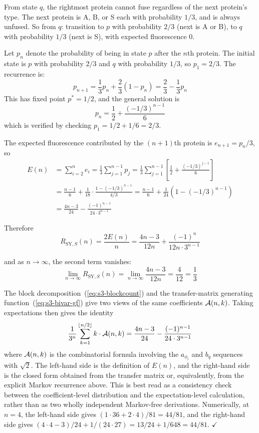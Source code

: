 \documentclass[referee,lineno,pdflatex,sn-mathphys-ay]{sn-jnl}
\DeclarePairedDelimiter\floor{\lfloor}{\rfloor}
\newcommand{\cA}{ {\cal A} }
\begin{document}
From state $q$, the rightmost protein cannot fuse regardless of the next protein's type. The next protein is A, B, or S each with probability $1/3$, and is always unfused. So from $q$: transition to $p$ with probability $2/3$ (next is A or B), to $q$ with probability $1/3$ (next is S), with expected fluorescence $0$.

Let $p_n$ denote the probability of being in state $p$ after the $n$th protein. The initial state is $p$ with probability $2/3$ and $q$ with probability $1/3$, so $p_1 = 2/3$. The recurrence is:
\[
p_{n+1} = \frac{1}{3} p_n + \frac{2}{3}(1 - p_n) = \frac{2}{3} - \frac{1}{3} p_n
\]
This has fixed point $p^* = 1/2$, and the general solution is
\[
p_n = \frac{1}{2} + \frac{(-1/3)^{n-1}}{6}
\]
which is verified by checking $p_1 = 1/2 + 1/6 = 2/3$.

The expected fluorescence contributed by the $(n+1)$th protein is $e_{n+1} = p_n / 3$, so
\begin{align*}
E(n) &= \sum_{i=2}^{n} e_i = \frac{1}{3} \sum_{j=1}^{n-1} p_j = \frac{1}{3} \sum_{j=1}^{n-1} \left[ \frac{1}{2} + \frac{(-1/3)^{j-1}}{6} \right] \\
&= \frac{n-1}{6} + \frac{1}{18} \cdot \frac{1 - (-1/3)^{n-1}}{4/3} = \frac{n-1}{6} + \frac{1}{24}\left(1 - (-1/3)^{n-1}\right) \\
&= \frac{4n - 3}{24} - \frac{(-1)^{n-1}}{24 \cdot 3^{n-1}}
\end{align*}

Therefore
\[
R_{\text{SY},S}(n) = \frac{2E(n)}{n} = \frac{4n-3}{12n} + \frac{(-1)^n}{12n \cdot 3^{n-1}}
\]

and as $n \to \infty$, the second term vanishes:
\[
\lim_{n \to \infty} R_{\text{SY},S}(n) = \lim_{n \to \infty} \frac{4n - 3}{12n} = \frac{4}{12} = \frac{1}{3}
\]

The block decomposition~(\ref{eq:s3-blockcount}) and the transfer-matrix generating function~(\ref{eq:s3-bivar-gf}) give two views of the same coefficients $\cA(n,k)$. Taking expectations then gives the identity
\[
\frac{1}{3^n} \sum_{k=1}^{\floor{n/2}} k \cdot \cA(n,k) = \frac{4n-3}{24} - \frac{(-1)^{n-1}}{24 \cdot 3^{n-1}}
\]
where $\cA(n,k)$ is the combinatorial formula involving the $a_{\phi_i}$ and $b_q$ sequences with $\sqrt{2}$. The left-hand side is the definition of $E(n)$, and the right-hand side is the closed form obtained from the transfer matrix or, equivalently, from the explicit Markov recurrence above. This is best read as a consistency check between the coefficient-level distribution and the expectation-level calculation, rather than as two wholly independent Markov-free derivations. Numerically, at $n = 4$, the left-hand side gives $(1 \cdot 36 + 2 \cdot 4)/81 = 44/81$, and the right-hand side gives $(4 \cdot 4 - 3)/24 + 1/(24 \cdot 27) = 13/24 + 1/648 = 44/81$. $\checkmark$
\end{document}

